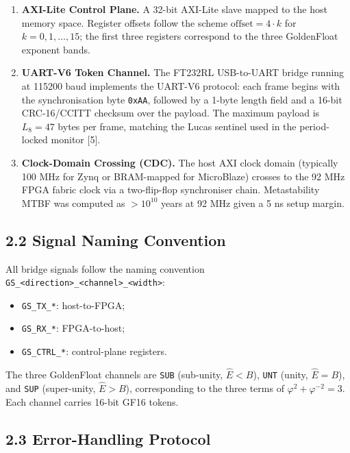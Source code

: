\begin{enumerate}
\def\labelenumi{\arabic{enumi}.}
\item
  \textbf{AXI-Lite Control Plane.} A 32-bit
  AXI-Lite slave mapped to the host memory space.
  Register offsets follow the scheme
  \(\text{offset} = 4 \cdot k\) for
  \(k = 0, 1, \ldots, 15\); the first three
  registers correspond to the three GoldenFloat
  exponent bands.
\item
  \textbf{UART-V6 Token Channel.} The FT232RL
  USB-to-UART bridge running at 115200 baud
  implements the UART-V6 protocol: each frame
  begins with the synchronisation byte
  \texttt{0xAA}, followed by a 1-byte length field
  and a 16-bit CRC-16/CCITT checksum over the
  payload. The maximum payload is \(L_8 = 47\)
  bytes per frame, matching the Lucas sentinel
  used in the period-locked monitor [5].
\item
  \textbf{Clock-Domain Crossing (CDC).} The host
  AXI clock domain (typically 100 MHz for Zynq or
  BRAM-mapped for MicroBlaze) crosses to the 92
  MHz FPGA fabric clock via a two-flip-flop
  synchroniser chain. Metastability MTBF was
  computed as \(> 10^{10}\) years at 92 MHz given
  a 5 ns setup margin.
\end{enumerate}

\subsection{2.2 Signal Naming
Convention}\label{fa_12:signal-naming-convention}

All bridge signals follow the naming convention
\texttt{GS\_\textless{}direction\textgreater{}\_\textless{}channel\textgreater{}\_\textless{}width\textgreater{}}:

\begin{itemize}
\tightlist
\item
  \texttt{GS\_TX\_*}: host-to-FPGA;
\item
  \texttt{GS\_RX\_*}: FPGA-to-host;
\item
  \texttt{GS\_CTRL\_*}: control-plane registers.
\end{itemize}

The three GoldenFloat channels are \texttt{SUB}
(sub-unity, \(\hat E < B\)), \texttt{UNT} (unity,
\(\hat E = B\)), and \texttt{SUP} (super-unity,
\(\hat E > B\)), corresponding to the three terms
of \(\varphi^2 + \varphi^{-2} = 3\). Each channel
carries 16-bit GF16 tokens.

\subsection{2.3 Error-Handling
Protocol}\label{fa_12:error-handling-protocol}

